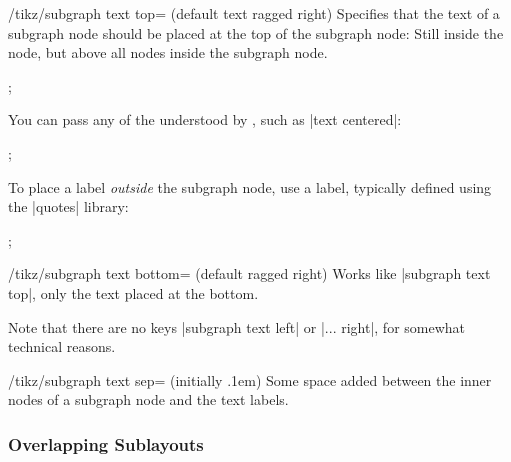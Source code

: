 \begin{key}{/tikz/subgraph text top= (default text ragged right)}
  Specifies that the text of a subgraph node should be placed at the
  top of the subgraph node: Still inside the node, but above all nodes
  inside the subgraph node.
\begin{codeexample}[] 
\tikz [subgraph text top=text ragged left]
  ;
\end{codeexample}  
  You can pass any of the  understood by
  \tikzname, such as |text centered|:
\begin{codeexample}[width=5cm] 
\tikz [subgraph text top=text centered]
  ;
\end{codeexample}   
  To place a label \emph{outside} the subgraph node, use a label,
  typically defined using the |quotes| library:
\begin{codeexample}[] 
\tikz {};
\end{codeexample}  
\end{key}


\begin{key}{/tikz/subgraph text bottom= (default ragged right)}
  Works like |subgraph text top|, only the text placed at the bottom. 
\end{key}

Note that there are no keys |subgraph text left| or |... right|,
for somewhat technical reasons.

\begin{key}{/tikz/subgraph text sep= (initially .1em)}
  Some space added between the inner nodes of a subgraph node and the
  text labels.
\end{key}


\subsubsection{Overlapping Sublayouts}

